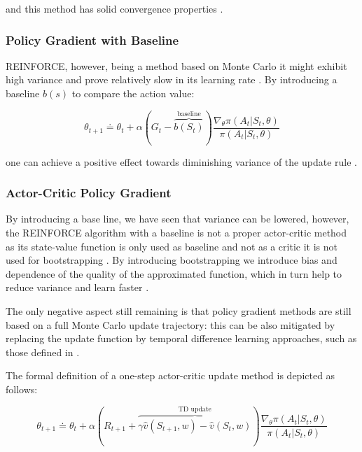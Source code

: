 \documentclass{seal_thesis}
\begin{document}
and this method has solid convergence properties \cite[p. 271]{Sutton2017}.

\subsubsection{Policy Gradient with Baseline}

REINFORCE, however, being a method based on Monte Carlo it might exhibit high variance and prove relatively slow in its learning rate \cite[p. 271]{Sutton2017}. By introducing a baseline $b(s)$ to compare the action value:

\begin{equation}
	\theta_{t+1} \doteq \theta_t + \alpha (G_t - \overbrace{b(S_t)}^{\text{baseline}}) \frac{\nabla_\theta \pi(A_t|S_t,\theta)}{\pi(A_t|S_t,\theta)}
\end{equation}

one can achieve a positive effect towards diminishing variance of the update rule \cite[p. 271]{Sutton2017}.

\subsubsection{Actor-Critic Policy Gradient}

By introducing a base line, we have seen that variance can be lowered, however, the REINFORCE algorithm with a baseline is not a proper actor-critic method as its state-value function is only used as baseline and not as a critic \ie it is not used for bootstrapping \cite[p. 273]{Sutton2017}. By introducing bootstrapping we introduce bias and dependence of the quality of the approximated function, which in turn help to reduce variance and learn faster \cite[p. 273]{Sutton2017}. 

The only negative aspect still remaining is that policy gradient methods are still based on a full Monte Carlo update trajectory: this can be also mitigated by replacing the update function by temporal difference learning approaches, such as those defined in  \cite[p. 273]{Sutton2017}.

The formal definition of a one-step actor-critic update method is depicted as follows:

\begin{equation}
	\theta_{t+1} \doteq \theta_t + \alpha(R_{t+1} + \overbrace{\gamma \hat{v}(S_{t+1},w)-\hat{v}(S_t,w)}^{\text{TD update}}) \frac{\nabla_\theta \pi(A_t|S_t,\theta)}{\pi(A_t|S_t,\theta)}
\end{equation}
\end{document}
